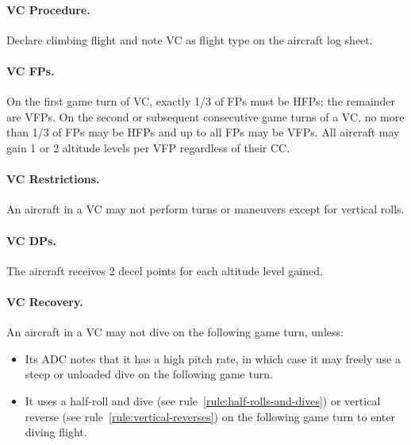 {\paragraph{VC Procedure.} Declare climbing flight and note VC as flight type on the aircraft log sheet. 

\paragraph{VC FPs.} On the first game turn of VC, exactly 1/3 of FPs must be HFPs; the remainder are VFPs. On the second or subsequent consecutive game turns of a VC, no more than 1/3 of FPs may be HFPs and up to all FPs may be VFPs. All aircraft may gain 1 or 2 altitude levels per VFP regardless of their CC.

\paragraph{VC Restrictions.} An aircraft in a VC may not perform turns or maneuvers except for vertical rolls. 

\paragraph{VC DPs.} The aircraft receives 2 decel points for each altitude level gained.

\paragraph{VC Recovery.} An aircraft in a VC may not dive on the following game turn, unless:

\begin{itemize}

    \item Its ADC notes that it has a high pitch rate, in which case it may freely use a steep or unloaded dive on the following game turn.

    \item It uses a half-roll and dive (see rule~\ref{rule:half-rolls-and-dives}) or vertical reverse (see rule~\ref{rule:vertical-reverses}) on the following game turn to enter diving flight.
    
\end{itemize}
}


